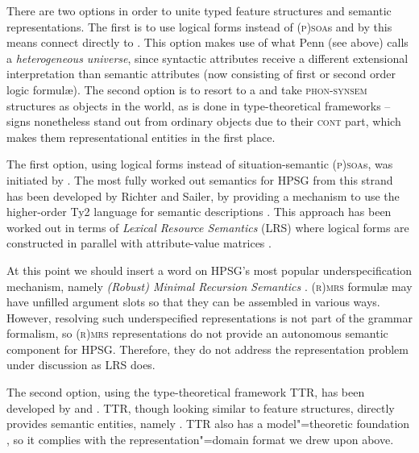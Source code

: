 \documentclass[output=paper
	        ,collection
	        ,collectionchapter
 	        ,biblatex
                ,babelshorthands
                ,newtxmath
                ,draftmode
                ,colorlinks, citecolor=brown
]{langscibook}
\begin{document}
There are two options in order to unite typed feature structures and semantic representations.
%
The first is to use logical forms  instead of \textsc{(p)soa}s and by this means connect directly to .
%
This option makes use of what Penn (see above) calls a \emph{heterogeneous universe},  since syntactic attributes receive a different extensional interpretation than  semantic attributes (now consisting of first or second order logic formul{\ae}).
%
The second option is to resort to a  and take \textsc{phon-synsem} structures as objects in the world, as is done in type-theoretical frameworks  -- signs nonetheless stand out from ordinary objects due to their \textsc{cont} part, which makes them representational entities in the first place.



The first option, using logical forms instead of situation-semantic \textsc{(p)soa}s, was initiated by \citet{Nerbonne:1992}. 
%
The most fully worked out semantics for HPSG from this strand has been developed by Richter and Sailer, by providing a mechanism to use the higher-order Ty2 language for semantic descriptions \citep{Richter:Sailer:1999:a}.
%
This approach has been worked out in terms of \emph{Lexical Resource Semantics} (LRS)  %
where logical forms are constructed in parallel with attribute-value matrices \citep{Richter:Sailer:04}.


At this point we should insert a word on HPSG's most popular underspecification mechanism, namely \emph{(Robust) Minimal Recursion Semantics}  \citep*{Copestake:Flickinger:Pollard:Sag:2005,Copestake:2007}.
%
\textsc{(r)mrs} formul{\ae} may have unfilled argument slots so that they can be assembled in various ways.
%
However, resolving such underspecified representations is not part of the grammar formalism, so \textsc{(r)mrs} representations do not provide an autonomous semantic component for HPSG.
%
Therefore, they do not address the representation problem under discussion as LRS does. 


The second option, using the type-theoretical framework  TTR, has been developed by \citet{Cooper:2008,Cooper:2014:a,Cooper:ms} and \citet{Ginzburg:2012}.
%
TTR, though looking similar to feature structures, directly provides semantic entities, namely  \citep[Sec.~5.2.2]{Ginzburg:2012}.
%
TTR also has a model"=theoretic foundation \citep{Cooper:ms}, so it complies with the representation"=domain format we drew upon above.
\end{document}

